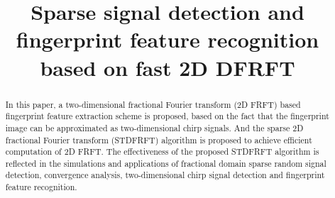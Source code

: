 \documentclass[conference]{IEEEtran}
\begin{document}
\title{Sparse signal detection and fingerprint feature recognition based on fast 2D DFRFT
}

\author{
\and
{}
}

\maketitle

\begin{abstract}
In this paper, a two-dimensional fractional Fourier transform (2D FRFT) based fingerprint feature extraction scheme is proposed, based on the fact that the fingerprint image can be approximated as two-dimensional chirp signals. And the sparse 2D fractional Fourier transform (STDFRFT) algorithm is proposed to achieve efficient computation of 2D FRFT. The effectiveness of the proposed STDFRFT algorithm is reflected in the simulations and applications of fractional domain sparse random signal detection, convergence analysis, two-dimensional chirp signal detection and fingerprint feature recognition. 
\end{abstract}
\end{document}
